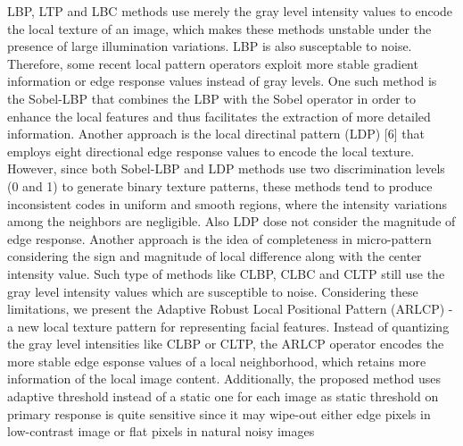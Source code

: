 \documentclass[12pt]{article}
\begin{document}
LBP, LTP and LBC methods use merely the gray level intensity values to encode the local texture of an image, which makes these methods unstable under the presence of large illumination variations. LBP is also susceptable to noise. Therefore, some recent local pattern operators exploit more stable gradient information or edge response values instead of gray levels. One such method is the Sobel-LBP that combines the LBP with the Sobel operator in order to enhance the local features and thus facilitates the extraction of more detailed information. Another approach is the local directinal pattern (LDP) [6] that employs eight directional edge response values to encode the local texture. However,
since both Sobel-LBP and LDP methods use two discrimination levels (0
and 1) to generate binary texture patterns, these methods tend to produce inconsistent codes in uniform and smooth regions, where the intensity variations among the neighbors are negligible. Also LDP dose  not consider the magnitude of edge response. Another approach is the idea of completeness in micro-pattern considering the sign and magnitude of local difference along with the center intensity value. Such type of methods like CLBP, CLBC and CLTP still use the gray level intensity values which are susceptible to noise. Considering these limitations, we present the Adaptive Robust Local Positional Pattern (ARLCP) - a new local texture pattern for representing facial features. Instead of quantizing the gray level intensities like CLBP or CLTP, the ARLCP operator encodes the more stable edge esponse values of a local neighborhood, which retains more information of the local image content. Additionally, the proposed method uses adaptive threshold instead of a static one for each image as static threshold on primary response is quite sensitive since it may wipe-out either edge pixels in low-contrast image or flat pixels in natural noisy images
\end{document}
